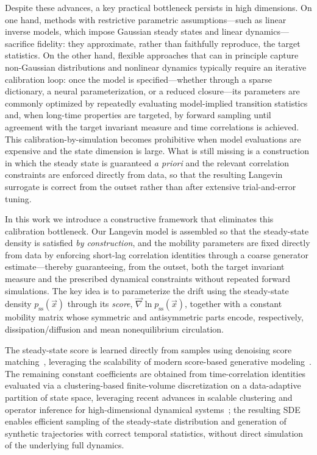 \documentclass[%
  prl,
  reprint,
  amsmath,
  amssymb,
  aps
]{revtex4-2}
\newcommand{\vvec}[1]{\vec{#1}}
\begin{document}
Despite these advances, a key practical bottleneck persists in high dimensions. On one hand, methods with restrictive parametric assumptions---such as linear inverse models, which impose Gaussian steady states and linear dynamics---sacrifice fidelity: they approximate, rather than faithfully reproduce, the target statistics. On the other hand, flexible approaches that can in principle capture non-Gaussian distributions and nonlinear dynamics typically require an iterative calibration loop: once the model is specified---whether through a sparse dictionary, a neural parameterization, or a reduced closure---its parameters are commonly optimized by repeatedly evaluating model-implied transition statistics and, when long-time properties are targeted, by forward sampling until agreement with the target invariant measure and time correlations is achieved. This calibration-by-simulation becomes prohibitive when model evaluations are expensive and the state dimension is large. What is still missing is a construction in which the steady state is guaranteed \emph{a priori} and the relevant correlation constraints are enforced directly from data, so that the resulting Langevin surrogate is correct from the outset rather than after extensive trial-and-error tuning.

In this work we introduce a constructive framework that eliminates this calibration bottleneck. Our Langevin model is assembled so that the steady-state density is satisfied \emph{by construction}, and the mobility parameters are fixed directly from data by enforcing short-lag correlation identities through a coarse generator estimate---thereby guaranteeing, from the outset, both the target invariant measure and the prescribed dynamical constraints without repeated forward simulations. The key idea is to parameterize the drift using the steady-state density $p_{\mathrm{ss}}(\vvec x)$ through its \emph{score}, $\vvec{\nabla}\ln p_{\mathrm{ss}}(\vvec x)$, together with a constant mobility matrix whose symmetric and antisymmetric parts encode, respectively, dissipation/diffusion and mean nonequilibrium circulation.

The steady-state score is learned directly from samples using denoising score matching~\cite{Hyvarinen2005,Vincent2011,giorgini2025kgmm}, leveraging the scalability of modern score-based generative modeling~\cite{SongSohlDicksteinKingma2021,Giorgini2024PRLScore,giorgini2025predicting, giorgini2025statistical}. The remaining constant coefficients are obtained from time-correlation identities evaluated via a clustering-based finite-volume discretization on a data-adaptive partition of state space, leveraging recent advances in scalable clustering and operator inference for high-dimensional dynamical systems~\cite{falasca2024data,falasca2025FDT,giorgini2025learning,giorgini2024reduced,souza2024representing_a,souza2024representing_b,souza2024modified}; the resulting SDE enables efficient sampling of the steady-state distribution and generation of synthetic trajectories with correct temporal statistics, without direct simulation of the underlying full dynamics.
\end{document}

